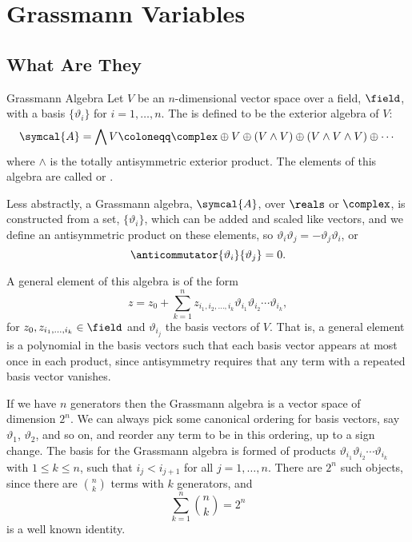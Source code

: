 \chapter{Grassmann Variables}
\label{app:grasmmann variables}
\section{What Are They}
\begin{dfn}{Grassmann Algebra}{}
    Let \(V\) be an \(n\)-dimensional vector space over a field, \(\field\), with a basis \(\{\vartheta_i\}\) for \(i =1, \dotsc, n\).
    The  is defined to be the exterior algebra of \(V\):
    \begin{equation}
        \symcal{A} = \bigwedge V \coloneqq \complex \oplus V \oplus (V \wedge V) \oplus (V \wedge V \wedge V) \oplus \dotsb
    \end{equation}
    where \(\wedge\) is the totally antisymmetric exterior product.
    The elements of this algebra are called  or .
\end{dfn}

Less abstractly, a Grassmann algebra, \(\symcal{A}\), over \(\reals\) or \(\complex\), is constructed from a set, \(\{\vartheta_i\}\), which can be added and scaled like vectors, and we define an antisymmetric product on these elements, so \(\vartheta_i \vartheta_j = -\vartheta_j\vartheta_i\), or
\begin{equation}
    \anticommutator{\vartheta_i}{\vartheta_j} = 0.
\end{equation}

A general element of this algebra is of the form
\begin{equation}
    z = z_0 + \sum_{k=1}^{n} z_{i_1,i_2,\dotsc,i_k}\vartheta_{i_1}\vartheta_{i_2}\dotsm\vartheta_{i_k},
\end{equation}
for \(z_0, z_{i_1, \dotsc, i_k} \in \field\) and \(\vartheta_{i_j}\) the basis vectors of \(V\).
That is, a general element is a polynomial in the basis vectors such that each basis vector appears at most once in each product, since antisymmetry requires that any term with a repeated basis vector vanishes.

If we have \(n\) generators then the Grassmann algebra is a vector space of dimension \(2^n\).
We can always pick some canonical ordering for basis vectors, say \(\vartheta_1\), \(\vartheta_2\), and so on, and reorder any term to be in this ordering, up to a sign change.
The basis for the Grassmann algebra is formed of products \(\vartheta_{i_1} \vartheta_{i_2} \dotsm \vartheta_{i_k}\) with \(1 \le k \le n\), such that \(i_{j} < i_{j+1}\) for all \(j = 1, \dotsc, n\).
There are \(2^n\) such objects, since there are \(\binom{n}{k}\) terms with \(k\) generators, and
\begin{equation}
    \sum_{k = 1}^{n} \binom{n}{k} = 2^n
\end{equation}
is a well known identity.

